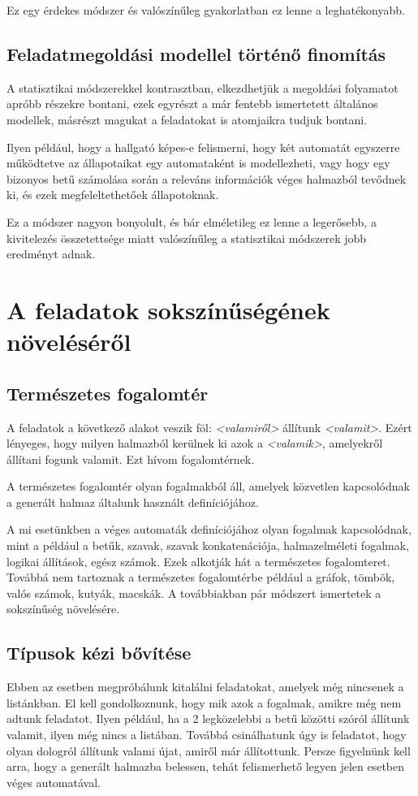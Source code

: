 \documentclass[12pt]{report}
\theoremstyle{definition}
\begin{document}
Ez egy érdekes módszer és valószínűleg gyakorlatban ez lenne a leghatékonyabb.

\subsection{Feladatmegoldási modellel történő finomítás}
A statisztikai módszerekkel kontrasztban, elkezdhetjük a megoldási folyamatot apróbb részekre bontani, ezek egyrészt a már fentebb ismertetett általános modellek, másrészt magukat a feladatokat is atomjaikra tudjuk bontani.

Ilyen például, hogy a hallgató képes-e felismerni, hogy két automatát egyszerre működtetve az állapotaikat egy automataként is modellezheti, vagy hogy egy bizonyos betű számolása során a releváns információk véges halmazból tevődnek ki, és ezek megfeleltethetőek állapotoknak.

Ez a módszer nagyon bonyolult, és bár elméletileg ez lenne a legerősebb, a kivitelezés összetettsége miatt valószínűleg a statisztikai módszerek jobb eredményt adnak.

\section{A feladatok sokszínűségének növeléséről}
\subsection*{Természetes fogalomtér}
A feladatok a következő alakot veszik föl: \textit{<valamiről>} állítunk \textit{<valamit>}. Ezért lényeges, hogy milyen halmazból kerülnek ki azok a \textit{<valamik>}, amelyekről állítani fogunk valamit. Ezt hívom fogalomtérnek.

A természetes fogalomtér olyan fogalmakból áll, amelyek közvetlen kapcsolódnak a generált halmaz általunk használt definíciójához.

A mi esetünkben a véges automaták definíciójához olyan fogalmak kapcsolódnak, mint a például a betűk, szavak, szavak konkatenációja, halmazelméleti fogalmak, logikai állítások, egész számok. Ezek alkotják hát a természetes fogalomteret. Továbbá nem tartoznak a természetes fogalomtérbe például a gráfok, tömbök, valós számok, kutyák, macskák. A továbbiakban pár módszert ismertetek a sokszínűség növelésére.

\subsection*{Típusok kézi bővítése}
Ebben az esetben megpróbálunk kitalálni feladatokat, amelyek még nincsenek a listánkban. El kell gondolkoznunk, hogy mik azok a fogalmak, amikre még nem adtunk feladatot. Ilyen például, ha a 2 legközelebbi a betű közötti szóról állítunk valamit, ilyen még nincs a listában. Továbbá csinálhatunk úgy is feladatot, hogy olyan dologról állítunk valami újat, amiről már állítottunk. Persze figyelnünk kell arra, hogy a generált halmazba belessen, tehát felismerhető legyen jelen esetben véges automatával.
\end{document}
